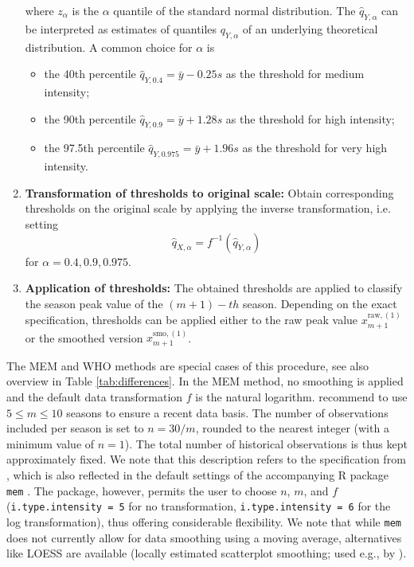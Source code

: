 \documentclass{article}
\newcommand{\sd}{s}
\begin{document}
\begin{enumerate}
where $z_\alpha$ is the $\alpha$ quantile of the standard normal distribution. The $\hat{q}_{Y, \alpha}$ can be interpreted as estimates of quantiles $q_{Y, \alpha}$ of an underlying theoretical distribution. A common choice for $\alpha$ is
\begin{itemize}
\item the 40th percentile $\hat{q}_{Y, 0.4} = \bar{y} - 0.25 \sd$ as the threshold for medium intensity;
\item the 90th percentile $\hat{q}_{Y, 0.9} = \bar{y} + 1.28 \sd$ as the threshold for high intensity;
\item the 97.5th percentile $\hat{q}_{Y, 0.975} = \bar{y} + 1.96\sd$ as the threshold for very high intensity.
\end{itemize}
\item \textbf{Transformation of thresholds to original scale:} Obtain corresponding thresholds on the original scale by applying the inverse transformation, i.e. setting %
$$
\hat{q}_{X, \alpha} = f^{-1}(\hat{q}_{Y, \alpha})
$$
for $\alpha = 0.4, 0.9, 0.975$.
\item \textbf{Application of thresholds:} The obtained thresholds are applied to classify the season peak value of the $(m + 1)-th$ season. Depending on the exact specification, thresholds can be applied either to the raw peak value $x_{m + 1}^{\text{raw}, (1)}$ or the smoothed version $x_{m + 1}^{\text{smo}, (1)}$.
\end{enumerate}

\noindent The MEM and WHO methods are special cases of this procedure, see also overview in Table \ref{tab:differences}. In the MEM method, no smoothing is applied and the default data transformation $f$ is the natural logarithm.  \cite{Vega2015} recommend to use $5 \leq m \leq 10$ seasons to ensure a recent data basis. The number of observations included per season is set to $n = 30/m$, rounded to the nearest integer (with a minimum value of $n = 1$). The total number of historical observations is thus kept approximately fixed. We note that this description refers to the specification from \cite{Vega2015}, which is also reflected in the default settings of the accompanying R package \texttt{mem} \citep{Lozano2020}. The package, however, permits the user to choose $n$, $m$, and $f$ (\texttt{i.type.intensity	= 5} for no transformation, \texttt{i.type.intensity = 6} for the log transformation), thus offering considerable flexibility. We note that while \texttt{mem} does not currently allow for data smoothing using a moving average, alternatives like LOESS are available (locally estimated scatterplot smoothing; used e.g., by \citealt{Wang2023}). %
\end{document}
